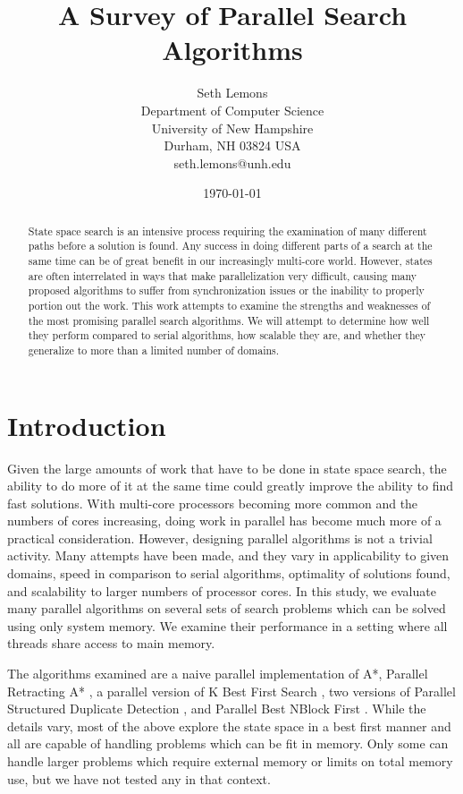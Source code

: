 \documentclass{article}
\title{A Survey of Parallel Search Algorithms}
\author{Seth Lemons \\
Department of Computer Science \\
University of New Hampshire \\
Durham, NH 03824 USA \\
seth.lemons@unh.edu}
\date{\today}
\begin{document}
\maketitle

\begin{abstract}
State space search is an intensive process requiring the examination of many different paths before a solution is found. Any success in doing different parts of a search at the same time can be of great benefit in our increasingly multi-core world. However, states are often interrelated in ways that make parallelization very difficult, causing many proposed algorithms to suffer from synchronization issues or the inability to properly portion out the work. This work attempts to examine the strengths and weaknesses of the most promising parallel search algorithms. We will attempt to determine how well they perform compared to serial algorithms, how scalable they are, and whether they generalize to more than a limited number of domains.
\end{abstract}

\section{Introduction}
Given the large amounts of work that have to be done in state space search, the ability to do more of it at the same time could greatly improve the ability to find fast solutions. With multi-core processors becoming more common and the numbers of cores increasing, doing work in parallel has become much more of a practical consideration. However, designing parallel algorithms is not a trivial activity. Many attempts have been made, and they vary in applicability to given domains, speed in comparison to serial algorithms, optimality of solutions found, and scalability to larger numbers of processor cores. In this study, we evaluate many parallel algorithms on several sets of search problems which can be solved using only system memory. We examine their performance in a setting where all threads share access to main memory.

The algorithms examined are a naive parallel implementation of A*, Parallel Retracting A* \cite{evett:pra}, a parallel version of K Best First Search \cite{felner:kbf}, two versions of Parallel Structured Duplicate Detection \cite{zhou:psd}, and Parallel Best NBlock First \cite{burns:par}. While the details vary, most of the above explore the state space in a best first manner and all are capable of handling problems which can be fit in memory. Only some can handle larger problems which require external memory or limits on total memory use, but we have not tested any in that context.
\end{document}
